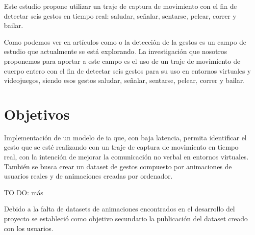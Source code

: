 Este estudio propone utilizar un traje de captura de movimiento con el fin de detectar seis gestos en tiempo real: saludar, señalar, sentarse, pelear, correr y bailar.

Como podemos ver en artículos como \cite{Neverova} o \cite{VRHANDS} la detección de la gestos es un campo de estudio que actualmente se está explorando.
La investigación que nosotros proponemos para aportar a este campo es el uso de un traje de movimiento de cuerpo entero con el fin de detectar seis gestos para su uso en entornos virtuales y videojuegos, siendo esos gestos saludar, señalar, sentarse, pelear, correr y bailar.

\section{Objetivos}
Implementación de un modelo de \gls{ia} que, con baja latencia, permita identificar el gesto que se esté realizando con un traje de captura de movimiento en tiempo real, con  la intención de mejorar la comunicación no verbal en entornos virtuales. También se busca crear un dataset de gestos compuesto por animaciones de usuarios reales y de animaciones creadas por ordenador.

TO DO: más

Debido a la falta de datasets de animaciones encontrados en el desarrollo del proyecto se estableció como objetivo secundario la publicación del dataset creado con los usuarios.

